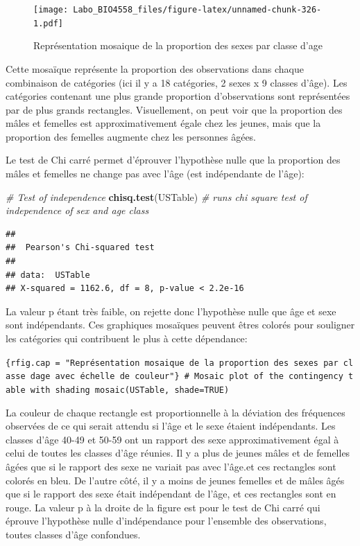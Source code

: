 \documentclass[
  12pt,
]{book}
\newenvironment{Shaded}{\begin{snugshade}}{\end{snugshade}}
\newcommand{\CommentTok}[1]{\textcolor[rgb]{0.56,0.35,0.01}{\textit{#1}}}
\newcommand{\KeywordTok}[1]{\textcolor[rgb]{0.13,0.29,0.53}{\textbf{#1}}}
\newcommand{\NormalTok}[1]{#1}
\begin{document}
\begin{figure}
\centering
\texttt{[image: Labo\_BIO4558\_files/figure-latex/unnamed-chunk-326-1.pdf]}
\caption{\label{fig:unnamed-chunk-326}Représentation mosaique de la proportion des sexes par classe d'age}
\end{figure}

Cette mosaïque représente la proportion des observations dans chaque combinaison de catégories (ici il y a 18 catégories, 2 sexes x 9 classes d'âge). Les catégories contenant une plus grande proportion d'observations sont représentées par de plus grands rectangles. Visuellement, on peut voir que la proportion des mâles et femelles est approximativement égale chez les jeunes, mais que la proportion des femelles augmente chez les personnes âgées.

Le test de Chi carré permet d'éprouver l'hypothèse nulle que la proportion des mâles et femelles ne change pas avec l'âge (est indépendante de l'âge):

\begin{Shaded}
\begin{Highlighting}[]
\CommentTok{\# Test of independence}
\KeywordTok{chisq.test}\NormalTok{(USTable) }\CommentTok{\# runs chi square test of independence of sex and age class}
\end{Highlighting}
\end{Shaded}

\begin{verbatim}
## 
##  Pearson's Chi-squared test
## 
## data:  USTable
## X-squared = 1162.6, df = 8, p-value < 2.2e-16
\end{verbatim}

La valeur p étant très faible, on rejette donc l'hypothèse nulle que âge et sexe sont indépendants. Ces graphiques mosaïques peuvent êtres colorés pour souligner les catégories qui contribuent le plus à cette dépendance:

\texttt{\{rfig.cap\ =\ "Représentation\ mosaique\ de\ la\ proportion\ des\ sexes\ par\ classe\ d\textquotesingle{}age\ avec\ échelle\ de\ couleur"\}\ \#\ Mosaic\ plot\ of\ the\ contingency\ table\ with\ shading\ mosaic(USTable,\ shade=TRUE)}

La couleur de chaque rectangle est proportionnelle à la déviation des fréquences observées de ce qui serait attendu si l'âge et le sexe étaient indépendants. Les classes d'âge 40-49 et 50-59 ont un rapport des sexe approximativement égal à celui de toutes les classes d'âge réunies. Il y a plus de jeunes mâles et de femelles âgées que si le rapport des sexe ne variait pas avec l'âge.et ces rectangles sont colorés en bleu. De l'autre côté, il y a moins de jeunes femelles et de mâles âgés que si le rapport des sexe était indépendant de l'âge, et ces rectangles sont en rouge. La valeur p à la droite de la figure est pour le test de Chi carré qui éprouve l'hypothèse nulle d'indépendance pour l'ensemble des observations, toutes classes d'âge confondues.
\end{document}
